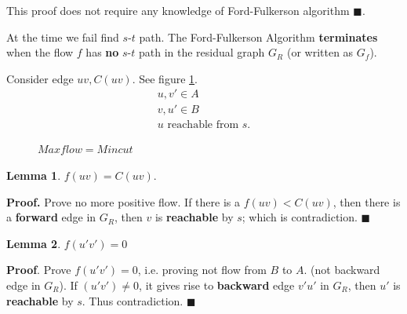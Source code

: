 \documentclass[a4paper]{report}
\theoremstyle{definition}
\newtheorem{lem}{Lemma}[section]
\begin{document}
This proof does not require any knowledge of Ford-Fulkerson algorithm $\blacksquare$.

At the time we fail find $s$-$t$ path. The Ford-Fulkerson Algorithm \textbf{terminates} when the flow $f$ has \textbf{no} $s$-$t$ path in the residual graph $G_R$ (or written as $G_f$).

Consider edge $uv, C(uv)$. See figure \ref{fig:7_5}.
\begin{align*}
u,v' \in A\\
v,u' \in B \\
u \text{ reachable from } s.
\end{align*}
\begin{figure}[!htp]
\centering
{}
\caption{$Maxflow = Mincut$}
\label{fig:7_5}
\end{figure}

\begin{lem}
 $f(uv)=C(uv)$.
\end{lem}
\textbf{Proof.} Prove no more positive flow. If there is a $f(uv)< C(uv)$, then there is a \textbf{forward} edge in $G_R$, then $v$ is \textbf{reachable} by $s$; which is contradiction. $\blacksquare$

\begin{lem}
$f(u'v')=0$
\end{lem}
\textbf{Proof}. Prove $f(u'v')=0$, i.e. proving not flow from $B$ to $A$. (not backward edge in $G_R$). If $(u'v')\neq 0$, it gives rise to \textbf{backward} edge $v'u'$ in $G_R$, then $u'$ is \textbf{reachable} by $s$. Thus contradiction. $\blacksquare$
\end{document}
